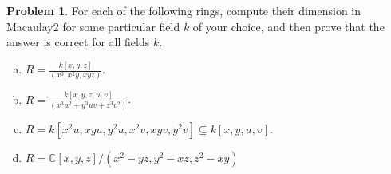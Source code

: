 \documentclass[11pt]{article}
\newcommand{\C}{\mathbb{C}}
\theoremstyle{definition}
\newtheorem{problem}{Problem}
\begin{document}
\vfill


\begin{problem}
	For each of the following rings, compute their dimension in Macaulay2 for some particular field $k$ of your choice, and then prove that the answer is correct for all fields $k$.

\begin{enumerate}[a)]
\item $\displaystyle R=\frac{k[x,y,z]}{(x^3,x^2y,xyz)}$.
\smallskip
\item $\displaystyle R=\frac{k[x,y,z,u,v]}{(x^3 u^2 + y^3 uv + z^3 v^2)}$.
\smallskip
\item $\displaystyle R=k[x^2 u, xyu, y^2 u, x^2 v, xyv, y^2v] \subseteq k[x,y,u,v]$.
\smallskip
\item $R=\C[x,y,z]/(x^2-yz, y^2-xz, z^2-xy)$
\end{enumerate}

\end{problem}
\end{document}
